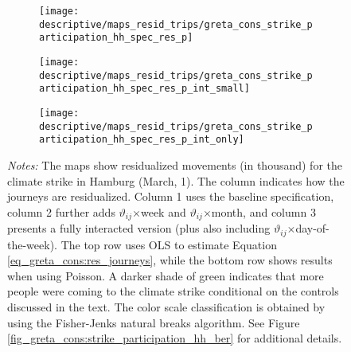 \begin{landscape}
\begin{figure}[H]
		\begin{subfigure}[h]{0.22\linewidth}\centering
			\texttt{[image: descriptive/maps\_resid\_trips/greta\_cons\_strike\_participation\_hh\_spec\_res\_p]}
		\end{subfigure}
		\begin{subfigure}[h]{0.22\linewidth}\centering
			\texttt{[image: descriptive/maps\_resid\_trips/greta\_cons\_strike\_participation\_hh\_spec\_res\_p\_int\_small]}
		\end{subfigure}
		\begin{subfigure}[h]{0.22\linewidth}\centering
			\texttt{[image: descriptive/maps\_resid\_trips/greta\_cons\_strike\_participation\_hh\_spec\_res\_p\_int\_only]}
		\end{subfigure}
		\begin{minipage}{0.9\linewidth}
			\scriptsize{\emph{Notes:} The maps show residualized movements (in thousand) for the climate strike in Hamburg (March, 1). The column indicates how the journeys are residualized. Column 1 uses the baseline specification, column 2 further adds $\vartheta_{ij}$$\times$week and  $\vartheta_{ij}$$\times$month, and column 3 presents a fully interacted version (plus also including $\vartheta_{ij}$$\times$day-of-the-week). The top row uses OLS to estimate Equation \ref{eq_greta_cons:res_journeys}, while the bottom row shows results when using Poisson. A darker shade of green indicates that more people were coming to the climate strike conditional on the controls discussed in the text. The color scale classification is obtained by using the Fisher-Jenks natural breaks algorithm. See Figure \ref{fig_greta_cons:strike_participation_hh_ber} for additional details.}
		\end{minipage}
	\end{figure}
	\vspace*{\fill}\clearpage
\end{landscape}
\restoregeometry


